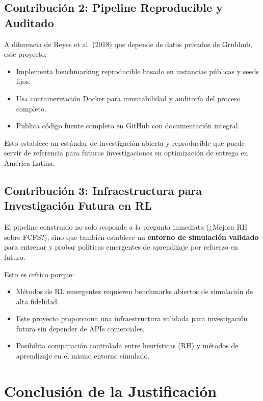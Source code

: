 \subsection{Contribución 2: Pipeline Reproducible y Auditado}

A diferencia de Reyes et al. (2018) que depende de datos privados de Grubhub, 
este proyecto:

\begin{itemize}
    \item Implementa benchmarking reproducible basado en instancias públicas 
    y seeds fijos.
    
    \item Usa containerización Docker para inmutabilidad y auditoría del 
    proceso completo.
    
    \item Publica código fuente completo en GitHub con documentación integral.
\end{itemize}

Esto establece un estándar de investigación abierta y reproducible que puede 
servir de referencia para futuras investigaciones en optimización de entrega 
en América Latina.

\subsection{Contribución 3: Infraestructura para Investigación Futura en RL}

El pipeline construido no solo responde a la pregunta inmediata 
(¿Mejora RH sobre FCFS?), sino que también establece un \textbf{entorno 
de simulación validado} para entrenar y probar políticas emergentes de 
aprendizaje por refuerzo en futuro.

Esto es crítico porque:

\begin{itemize}
    \item Métodos de RL emergentes requieren benchmarks abiertos de simulación 
    de alta fidelidad.
    
    \item Este proyecto proporciona una infraestructura validada para 
    investigación futura sin depender de APIs comerciales.
    
    \item Posibilita comparación controlada entre heurísticas (RH) y métodos 
    de aprendizaje en el mismo entorno simulado.
\end{itemize}

\section{Conclusión de la Justificación}

